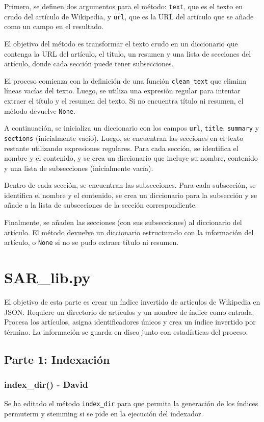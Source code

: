 \documentclass[12pt,a4paper]{article}
\begin{document}
Primero, se definen dos argumentos para el método: \texttt{text}, que es el texto en crudo del artículo de Wikipedia, y \texttt{url}, que es la URL del artículo que se añade como un campo en el resultado.

El objetivo del método es transformar el texto crudo en un diccionario que contenga la URL del artículo, el título, un resumen y una lista de secciones del artículo, donde cada sección puede tener subsecciones.

El proceso comienza con la definición de una función \texttt{clean\_text} que elimina líneas vacías del texto. Luego, se utiliza una expresión regular para intentar extraer el título y el resumen del texto. Si no encuentra título ni resumen, el método devuelve \texttt{None}.

A continuación, se inicializa un diccionario con los campos \texttt{url}, \texttt{title}, \texttt{summary} y \texttt{sections} (inicialmente vacío). Luego, se encuentran las secciones en el texto restante utilizando expresiones regulares. Para cada sección, se identifica el nombre y el contenido, y se crea un diccionario que incluye su nombre, contenido y una lista de subsecciones (inicialmente vacía).

Dentro de cada sección, se encuentran las subsecciones. Para cada subsección, se identifica el nombre y el contenido, se crea un diccionario para la subsección y se añade a la lista de subsecciones de la sección correspondiente.

Finalmente, se añaden las secciones (con sus subsecciones) al diccionario del artículo. El método devuelve un diccionario estructurado con la información del artículo, o \texttt{None} si no se pudo extraer título ni resumen.

\section{SAR\_lib.py}

El objetivo de esta parte es crear un índice invertido de artículos de Wikipedia en JSON. Requiere un directorio de artículos y un nombre de índice como entrada. Procesa los artículos, asigna identificadores únicos y crea un índice invertido por término. La información se guarda en disco junto con estadísticas del proceso.

\subsection{Parte 1: Indexación}
\subsubsection{index\_dir() - David}
Se ha editado el método \texttt{index\_dir} para que permita la generación de los índices permuterm y stemming si se pide en la ejecución del indexador.
\end{document}
